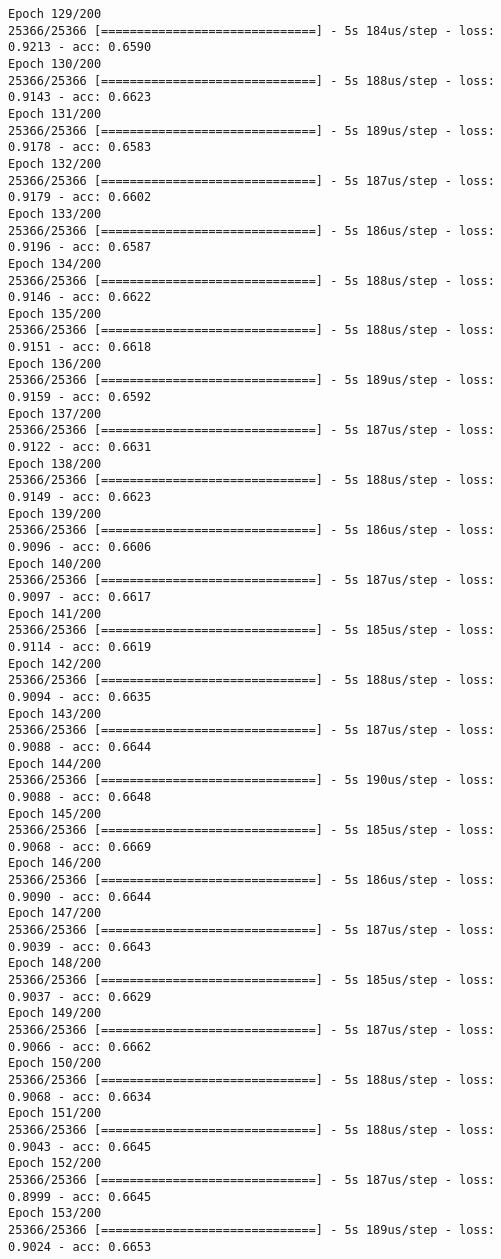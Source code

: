 \documentclass[11pt]{article}
\begin{document}
\begin{Verbatim}[commandchars=\\\{\}]
Epoch 129/200
25366/25366 [==============================] - 5s 184us/step - loss: 0.9213 - acc: 0.6590
Epoch 130/200
25366/25366 [==============================] - 5s 188us/step - loss: 0.9143 - acc: 0.6623
Epoch 131/200
25366/25366 [==============================] - 5s 189us/step - loss: 0.9178 - acc: 0.6583
Epoch 132/200
25366/25366 [==============================] - 5s 187us/step - loss: 0.9179 - acc: 0.6602
Epoch 133/200
25366/25366 [==============================] - 5s 186us/step - loss: 0.9196 - acc: 0.6587
Epoch 134/200
25366/25366 [==============================] - 5s 188us/step - loss: 0.9146 - acc: 0.6622
Epoch 135/200
25366/25366 [==============================] - 5s 188us/step - loss: 0.9151 - acc: 0.6618
Epoch 136/200
25366/25366 [==============================] - 5s 189us/step - loss: 0.9159 - acc: 0.6592
Epoch 137/200
25366/25366 [==============================] - 5s 187us/step - loss: 0.9122 - acc: 0.6631
Epoch 138/200
25366/25366 [==============================] - 5s 188us/step - loss: 0.9149 - acc: 0.6623
Epoch 139/200
25366/25366 [==============================] - 5s 186us/step - loss: 0.9096 - acc: 0.6606
Epoch 140/200
25366/25366 [==============================] - 5s 187us/step - loss: 0.9097 - acc: 0.6617
Epoch 141/200
25366/25366 [==============================] - 5s 185us/step - loss: 0.9114 - acc: 0.6619
Epoch 142/200
25366/25366 [==============================] - 5s 188us/step - loss: 0.9094 - acc: 0.6635
Epoch 143/200
25366/25366 [==============================] - 5s 187us/step - loss: 0.9088 - acc: 0.6644
Epoch 144/200
25366/25366 [==============================] - 5s 190us/step - loss: 0.9088 - acc: 0.6648
Epoch 145/200
25366/25366 [==============================] - 5s 185us/step - loss: 0.9068 - acc: 0.6669
Epoch 146/200
25366/25366 [==============================] - 5s 186us/step - loss: 0.9090 - acc: 0.6644
Epoch 147/200
25366/25366 [==============================] - 5s 187us/step - loss: 0.9039 - acc: 0.6643
Epoch 148/200
25366/25366 [==============================] - 5s 185us/step - loss: 0.9037 - acc: 0.6629
Epoch 149/200
25366/25366 [==============================] - 5s 187us/step - loss: 0.9066 - acc: 0.6662
Epoch 150/200
25366/25366 [==============================] - 5s 188us/step - loss: 0.9068 - acc: 0.6634
Epoch 151/200
25366/25366 [==============================] - 5s 188us/step - loss: 0.9043 - acc: 0.6645
Epoch 152/200
25366/25366 [==============================] - 5s 187us/step - loss: 0.8999 - acc: 0.6645
Epoch 153/200
25366/25366 [==============================] - 5s 189us/step - loss: 0.9024 - acc: 0.6653

\end{Verbatim}
\end{document}
